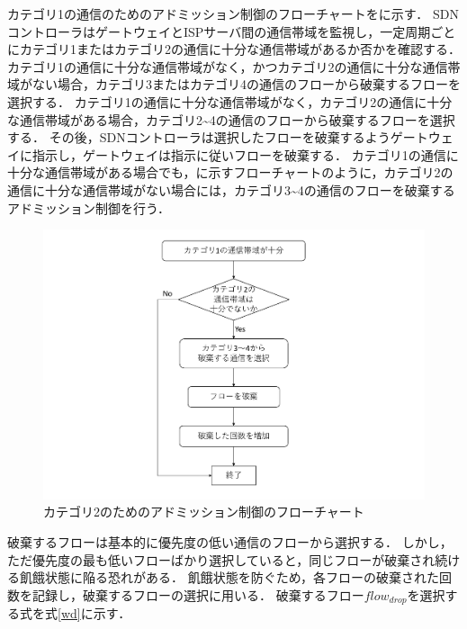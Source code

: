 \documentclass[a4paper,11pt,uplatex]{ujreport}
\begin{document}
  カテゴリ1の通信のためのアドミッション制御のフローチャートをに示す．
  SDNコントローラはゲートウェイとISPサーバ間の通信帯域を監視し，一定周期ごとにカテゴリ1またはカテゴリ2の通信に十分な通信帯域があるか否かを確認する．
  カテゴリ1の通信に十分な通信帯域がなく，かつカテゴリ2の通信に十分な通信帯域がない場合，カテゴリ3またはカテゴリ4の通信のフローから破棄するフローを選択する．
  カテゴリ1の通信に十分な通信帯域がなく，カテゴリ2の通信に十分な通信帯域がある場合，カテゴリ2\textasciitilde4の通信のフローから破棄するフローを選択する．
  その後，SDNコントローラは選択したフローを破棄するようゲートウェイに指示し，ゲートウェイは指示に従いフローを破棄する．
  カテゴリ1の通信に十分な通信帯域がある場合でも，に示すフローチャートのように，カテゴリ2の通信に十分な通信帯域がない場合には，カテゴリ3\textasciitilde4の通信のフローを破棄するアドミッション制御を行う．\par

  \begin{figure}[!tb]
    \centering
    \includegraphics[width=\linewidth]{img/adomission_c2.pdf}
    \caption{カテゴリ2のためのアドミッション制御のフローチャート}
    \label{fig:adomission2}
  \end{figure}

  破棄するフローは基本的に優先度の低い通信のフローから選択する．
  しかし，ただ優先度の最も低いフローばかり選択していると，同じフローが破棄され続ける飢餓状態に陥る恐れがある．
  飢餓状態を防ぐため，各フローの破棄された回数を記録し，破棄するフローの選択に用いる．
  破棄するフロー$flow_{drop}$を選択する式を式\ref{wd}に示す．\par
\end{document}
